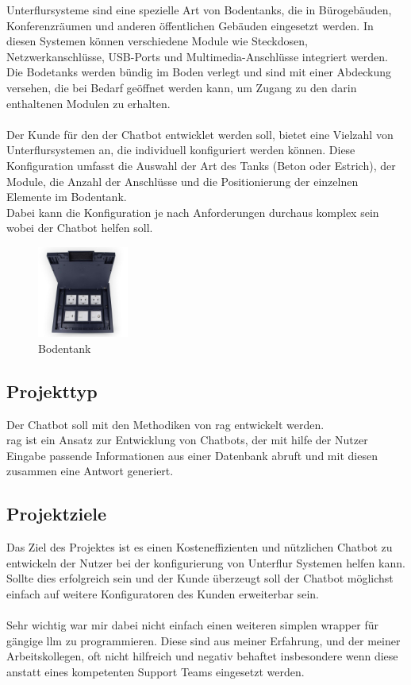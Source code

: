 Unterflursysteme sind eine spezielle Art von Bodentanks, die in Bürogebäuden, Konferenzräumen und anderen öffentlichen Gebäuden eingesetzt werden.
In diesen Systemen können verschiedene Module wie Steckdosen, Netzwerkanschlüsse, USB-Ports und Multimedia-Anschlüsse integriert werden.\\
Die Bodetanks werden bündig im Boden verlegt und sind mit einer Abdeckung versehen, die bei Bedarf geöffnet werden kann, um Zugang zu den darin enthaltenen Modulen zu erhalten.\\\\
Der Kunde für den der Chatbot entwicklet werden soll, bietet eine Vielzahl von Unterflursystemen an, die individuell konfiguriert werden können.
Diese Konfiguration umfasst die Auswahl der Art des Tanks (Beton oder Estrich), der Module, die Anzahl der Anschlüsse und die Positionierung der einzelnen Elemente im Bodentank.\\
Dabei kann die Konfiguration je nach Anforderungen durchaus komplex sein wobei der Chatbot helfen soll.

\begin{figure}[H]
    \begin{center}
        \includegraphics[width=3cm]{bilder/bodentank.jpeg}
        \caption{Bodentank}\label{fig:bodentank}
    \end{center}
\end{figure}

\pagebreak
\subsection{Projekttyp}\label{sec:proj_typ}
Der Chatbot soll mit den Methodiken von \gls{rag} entwickelt werden.\\
\gls{rag} ist ein Ansatz zur Entwicklung von Chatbots, der mit hilfe der Nutzer Eingabe
passende Informationen aus einer Datenbank abruft und mit diesen zusammen eine Antwort generiert.

\subsection{Projektziele}\label{sec:proj_ziele}
Das Ziel des Projektes ist es einen Kosteneffizienten und nützlichen Chatbot zu entwickeln der Nutzer
bei der konfigurierung von Unterflur Systemen helfen kann.\\
Sollte dies erfolgreich sein und der Kunde überzeugt soll der Chatbot
möglichst einfach auf weitere Konfiguratoren des Kunden erweiterbar sein.\\\\
Sehr wichtig war mir dabei nicht einfach einen weiteren simplen wrapper für gängige \gls{llm} zu programmieren.
Diese sind aus meiner Erfahrung, und der meiner Arbeitskollegen, oft nicht hilfreich und negativ behaftet insbesondere wenn diese
anstatt eines kompetenten Support Teams eingesetzt werden.

